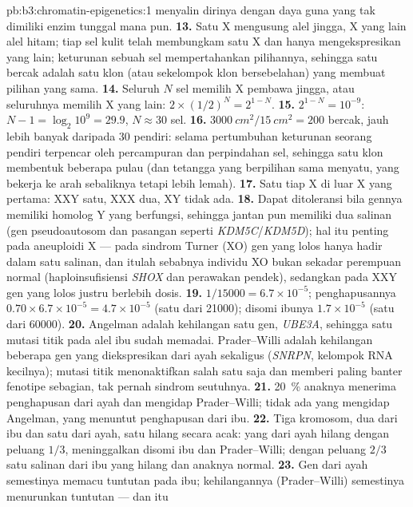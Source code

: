 \begin{solution}{pb:b3:chromatin-epigenetics:1}
menyalin dirinya dengan daya guna yang tak dimiliki enzim tunggal mana pun.
\textbf{13.} Satu X mengusung alel jingga, X yang lain alel hitam; tiap sel
kulit telah membungkam satu X dan hanya mengekspresikan yang lain;
keturunan sebuah sel mempertahankan pilihannya, sehingga satu bercak adalah
satu klon (atau sekelompok klon bersebelahan) yang membuat pilihan yang sama.
\textbf{14.} Seluruh $N$ sel memilih X pembawa jingga, atau seluruhnya
memilih X yang lain: $2\times (1/2)^{N} = 2^{1-N}$.
\textbf{15.} $2^{1-N} = 10^{-9}$: $N - 1 = \log_{2} 10^{9} = 29.9$,
$N \approx 30$ sel.
\textbf{16.} $\qty{3000}{cm^2}/\qty{15}{cm^2} = 200$ bercak, jauh lebih
banyak daripada $30$ pendiri: selama pertumbuhan keturunan seorang pendiri
terpencar oleh percampuran dan perpindahan sel, sehingga satu klon membentuk
beberapa pulau (dan tetangga yang berpilihan sama menyatu, yang bekerja ke
arah sebaliknya tetapi lebih lemah).
\textbf{17.} Satu  tiap X di luar X yang pertama: XXY satu, XXX
dua, XY tidak ada.
\textbf{18.} Dapat ditoleransi bila gennya memiliki homolog Y yang
berfungsi, sehingga jantan pun memiliki dua salinan (gen pseudoautosom dan
pasangan seperti \emph{KDM5C}/\emph{KDM5D}); hal itu penting pada aneuploidi
X --- pada sindrom Turner (XO) gen yang lolos hanya hadir dalam satu salinan,
dan itulah sebabnya individu XO bukan sekadar perempuan normal
(haploinsufisiensi \emph{SHOX} dan perawakan pendek), sedangkan pada XXY gen
yang lolos justru berlebih dosis.
\textbf{19.} $1/\num{15000} = 6.7\times 10^{-5}$; penghapusannya $0.70\times
6.7\times 10^{-5} = 4.7\times 10^{-5}$ (satu dari \num{21000}); disomi
ibunya $1.7\times 10^{-5}$ (satu dari \num{60000}).
\textbf{20.} Angelman adalah kehilangan satu gen, \emph{UBE3A}, sehingga
satu mutasi titik pada alel ibu sudah memadai. Prader--Willi adalah
kehilangan beberapa gen yang diekspresikan dari ayah sekaligus
(\emph{SNRPN}, kelompok RNA kecilnya); mutasi titik menonaktifkan salah satu
saja dan memberi paling banter fenotipe sebagian, tak pernah sindrom
seutuhnya.
\textbf{21.} \qty{20}{\%} anaknya menerima penghapusan dari ayah dan
mengidap Prader--Willi; tidak ada yang mengidap Angelman, yang menuntut
penghapusan dari ibu.
\textbf{22.} Tiga kromosom, dua dari ibu dan satu dari ayah, satu hilang
secara acak: yang dari ayah hilang dengan peluang $1/3$, meninggalkan disomi
ibu dan Prader--Willi; dengan peluang $2/3$ satu salinan dari ibu yang
hilang dan anaknya normal.
\textbf{23.} Gen dari ayah semestinya memacu tuntutan pada ibu;
kehilangannya (Prader--Willi) semestinya menurunkan tuntutan --- dan itu

\end{solution}
